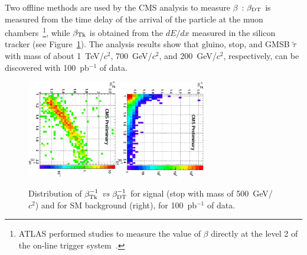 \documentclass{cimento}
\begin{document}
Two offline methods are used by the 
CMS analysis to measure $\beta$~\cite{HSCP}:
$\beta_{{\rm DT}}$ is measured from the time delay of the arrival of the particle
at the muon chambers~\footnote{ATLAS performed studies to measure 
the value of $\beta$ directly at the level 2 of the on-line 
trigger system~\cite{Aad:2009wy}.}, while $\beta_{{\rm Tk}}$ 
is obtained from the $dE/dx$ measured in the silicon tracker
(see Figure~\ref{fig:HSCPSigBkgPlots}).
The analysis results show that gluino, stop, 
and GMSB $\tilde{\tau}$  with mass of about 1~TeV/$c^2$, 700~GeV/$c^2$, 
and 200~GeV/$c^2$, respectively, can be discovered with 100~pb$^{-1}$ of data.
%
\begin{figure}[htbp] 
\centering
\includegraphics[angle=90,width=0.35\textwidth]{betaHSCPSig.eps}\includegraphics[angle=90,width=0.35\textwidth]{betaHSCPBkg.eps}  
\caption{Distribution of $\beta_{{\rm Tk}}^{-1}$ {\it vs} $\beta_{{\rm DT}}^{-1}$  
for signal (stop with mass of 500~GeV/$c^2$) and for SM background (right), 
for 100~pb$^{-1}$ of data. 
}
\label{fig:HSCPSigBkgPlots}
\end{figure}
%
\end{document}
